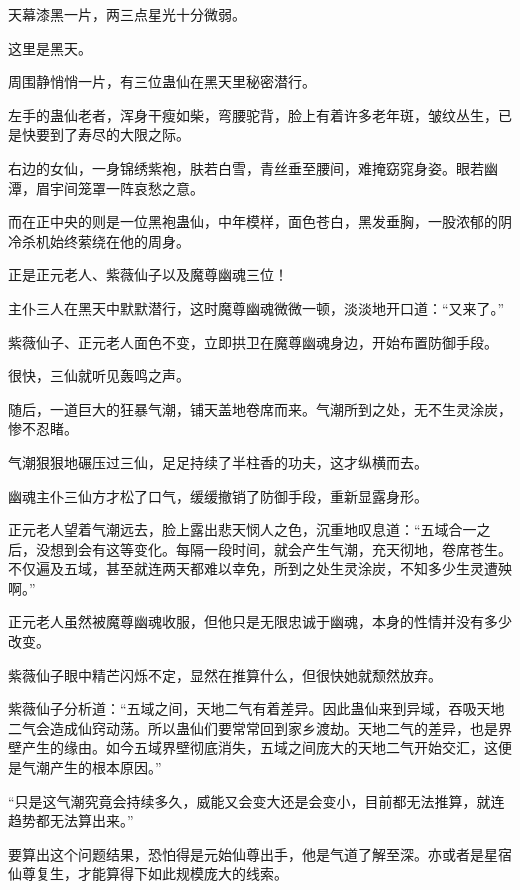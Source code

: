 
\begin{this_body}

天幕漆黑一片，两三点星光十分微弱。

这里是黑天。

周围静悄悄一片，有三位蛊仙在黑天里秘密潜行。

左手的蛊仙老者，浑身干瘦如柴，弯腰驼背，脸上有着许多老年斑，皱纹丛生，已是快要到了寿尽的大限之际。

右边的女仙，一身锦绣紫袍，肤若白雪，青丝垂至腰间，难掩窈窕身姿。眼若幽潭，眉宇间笼罩一阵哀愁之意。

而在正中央的则是一位黑袍蛊仙，中年模样，面色苍白，黑发垂胸，一股浓郁的阴冷杀机始终萦绕在他的周身。

正是正元老人、紫薇仙子以及魔尊幽魂三位！

主仆三人在黑天中默默潜行，这时魔尊幽魂微微一顿，淡淡地开口道：“又来了。”

紫薇仙子、正元老人面色不变，立即拱卫在魔尊幽魂身边，开始布置防御手段。

很快，三仙就听见轰鸣之声。

随后，一道巨大的狂暴气潮，铺天盖地卷席而来。气潮所到之处，无不生灵涂炭，惨不忍睹。

气潮狠狠地碾压过三仙，足足持续了半柱香的功夫，这才纵横而去。

幽魂主仆三仙方才松了口气，缓缓撤销了防御手段，重新显露身形。

正元老人望着气潮远去，脸上露出悲天悯人之色，沉重地叹息道：“五域合一之后，没想到会有这等变化。每隔一段时间，就会产生气潮，充天彻地，卷席苍生。不仅遍及五域，甚至就连两天都难以幸免，所到之处生灵涂炭，不知多少生灵遭殃啊。”

正元老人虽然被魔尊幽魂收服，但他只是无限忠诚于幽魂，本身的性情并没有多少改变。

紫薇仙子眼中精芒闪烁不定，显然在推算什么，但很快她就颓然放弃。

紫薇仙子分析道：“五域之间，天地二气有着差异。因此蛊仙来到异域，吞吸天地二气会造成仙窍动荡。所以蛊仙们要常常回到家乡渡劫。天地二气的差异，也是界壁产生的缘由。如今五域界壁彻底消失，五域之间庞大的天地二气开始交汇，这便是气潮产生的根本原因。”

“只是这气潮究竟会持续多久，威能又会变大还是会变小，目前都无法推算，就连趋势都无法算出来。”

要算出这个问题结果，恐怕得是元始仙尊出手，他是气道了解至深。亦或者是星宿仙尊复生，才能算得下如此规模庞大的线索。


\end{this_body}
